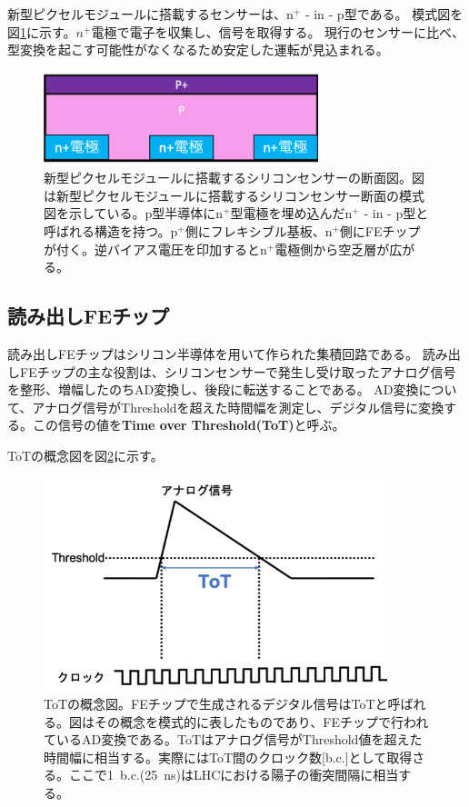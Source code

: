 新型ピクセルモジュールに搭載するセンサーは、n${}^+$ - in - p型である。
模式図を図\ref{sensor_image}に示す。$n^+$電極で電子を収集し、信号を取得する。
現行のセンサーに比べ、型変換を起こす可能性がなくなるため安定した運転が見込まれる\cite{1-3}。

\begin{figure}[bpt]\centering
\includegraphics[width=8cm]{./sensor_image.png}
\caption[新型ピクセルモジュールに搭載するシリコンセンサーの断面図]{新型ピクセルモジュールに搭載するシリコンセンサーの断面図。図は新型ピクセルモジュールに搭載するシリコンセンサー断面の模式図を示している。p型半導体にn${}^+$型電極を埋め込んだn${}^+$ - in - p型と呼ばれる構造を持つ。p${}^+$側にフレキシブル基板、n${}^+$側にFEチップが付く。逆バイアス電圧を印加するとn${}^+$電極側から空乏層が広がる。}
\label{sensor_image}
\end{figure}

\subsection{読み出しFEチップ}
読み出しFEチップはシリコン半導体を用いて作られた集積回路である。
読み出しFEチップの主な役割は、シリコンセンサーで発生し受け取ったアナログ信号を整形、増幅したのちAD変換し、後段に転送することである。
AD変換について、アナログ信号がThresholdを超えた時間幅を測定し、デジタル信号に変換する。この信号の値を\textbf{Time over Threshold(ToT)}と呼ぶ。

ToTの概念図を図\ref{tot_algorithm}に示す。

\begin{figure}[bpt]\centering
\includegraphics[width=10cm]{./tot_algorithm.png}
\caption[ToTの概念図]{ToTの概念図。FEチップで生成されるデジタル信号はToTと呼ばれる。図はその概念を模式的に表したものであり、FEチップで行われているAD変換である。ToTはアナログ信号がThreshold値を超えた時間幅に相当する。実際にはToT間のクロック数[b.c.]として取得さる。ここで1~b.c.(25~ns)はLHCにおける陽子の衝突間隔に相当する。}
\label{tot_algorithm}
\end{figure}

